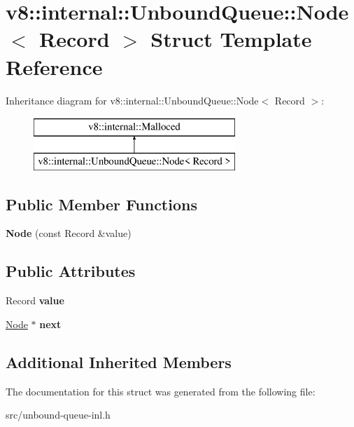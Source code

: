 \hypertarget{structv8_1_1internal_1_1_unbound_queue_1_1_node}{}\section{v8\+:\+:internal\+:\+:Unbound\+Queue\+:\+:Node$<$ Record $>$ Struct Template Reference}
\label{structv8_1_1internal_1_1_unbound_queue_1_1_node}
Inheritance diagram for v8\+:\+:internal\+:\+:Unbound\+Queue\+:\+:Node$<$ Record $>$\+:\begin{figure}[H]
\begin{center}
\leavevmode
\includegraphics[height=2.000000cm]{structv8_1_1internal_1_1_unbound_queue_1_1_node}
\end{center}
\end{figure}
\subsection*{Public Member Functions}
\begin{DoxyCompactItemize}
\item 
\hypertarget{structv8_1_1internal_1_1_unbound_queue_1_1_node_a55c00a4d6022ed3aa9fcb416149065a4}{}{\bfseries Node} (const Record \&value)\label{structv8_1_1internal_1_1_unbound_queue_1_1_node_a55c00a4d6022ed3aa9fcb416149065a4}

\end{DoxyCompactItemize}
\subsection*{Public Attributes}
\begin{DoxyCompactItemize}
\item 
\hypertarget{structv8_1_1internal_1_1_unbound_queue_1_1_node_a31f0b0c344dc954643a5cfea8f784619}{}Record {\bfseries value}\label{structv8_1_1internal_1_1_unbound_queue_1_1_node_a31f0b0c344dc954643a5cfea8f784619}

\item 
\hypertarget{structv8_1_1internal_1_1_unbound_queue_1_1_node_abfa5644ad3076a77801c08975716805d}{}\hyperlink{structv8_1_1internal_1_1_unbound_queue_1_1_node}{Node} $\ast$ {\bfseries next}\label{structv8_1_1internal_1_1_unbound_queue_1_1_node_abfa5644ad3076a77801c08975716805d}

\end{DoxyCompactItemize}
\subsection*{Additional Inherited Members}


The documentation for this struct was generated from the following file\+:\begin{DoxyCompactItemize}
\item 
src/unbound-\/queue-\/inl.\+h\end{DoxyCompactItemize}
